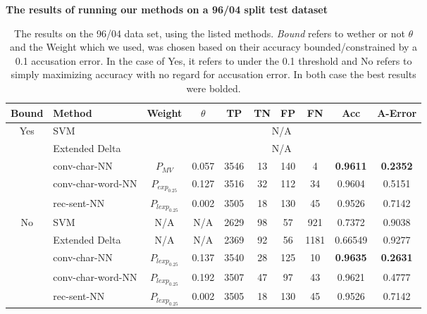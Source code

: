 \begin{table}[]
\centering
\textbf{The results of running our methods on a 96/04 split test dataset}\par\medskip
\begin{tabular}{|c|l|c|c|c|c|c|c|c|c|}
\hline
Bound                & Method                  & Weight            & $\theta$ & TP  & TN & FP & FN  & Acc             & A-Error         \\ \hline
\multirow{5}{*}{Yes} & SVM                     & \multicolumn{8}{c|}{N/A}                                                                   \\ \cline{2-10} 
                     & Extended Delta          & \multicolumn{8}{c|}{N/A}                                                                   \\ \cline{2-10} 
                     & \gls{conv-char-NN}      & $P_{MV}$          & 0.057    & 3546 & 13  & 140 & 4    & \textbf{0.9611} & \textbf{0.2352} \\ \cline{2-10} 
                     & \gls{conv-char-word-NN} & $P_{exp_{0.25}}$  & 0.127    & 3516 & 32  & 112 & 34   & 0.9604          & 0.5151          \\ \cline{2-10} 
                     & \gls{rec-sent-NN}       & $P_{lexp_{0.25}}$ & 0.002    & 3505 & 18  & 130 & 45   & 0.9526          & 0.7142          \\ \hline\hline
\multirow{5}{*}{No}  & SVM                     & N/A               & N/A      & 2629 & 98  & 57  & 921  & 0.7372          & 0.9038          \\ \cline{2-10} 
                     & Extended Delta          & N/A               & N/A      & 2369 & 92  & 56  & 1181 & 0.66549         & 0.9277          \\ \cline{2-10} 
                     & \gls{conv-char-NN}      & $P_{lexp_{0.25}}$ & 0.137    & 3540 & 28  & 125 & 10   & \textbf{0.9635} & \textbf{0.2631} \\ \cline{2-10} 
                     & \gls{conv-char-word-NN} & $P_{lexp_{0.25}}$ & 0.192    & 3507 & 47  & 97  & 43   & 0.9621          & 0.4777          \\ \cline{2-10} 
                     & \gls{rec-sent-NN}       & $P_{lexp_{0.25}}$ & 0.002    & 3505 & 18  & 130 & 45   & 0.9526          & 0.7142          \\ \hline
\end{tabular}
\caption{The results on the 96/04 data set, using the listed methods.
\textit{Bound} refers to wether or not $\theta$ and the Weight which we used,
was chosen based on their accuracy bounded/constrained by a 0.1 accusation error.
In the case of Yes, it refers to under the 0.1 threshold and No refers to simply
maximizing accuracy with no regard for accusation error. In both case
the best results were bolded.}
\label{tab:04_results}
\end{table}
